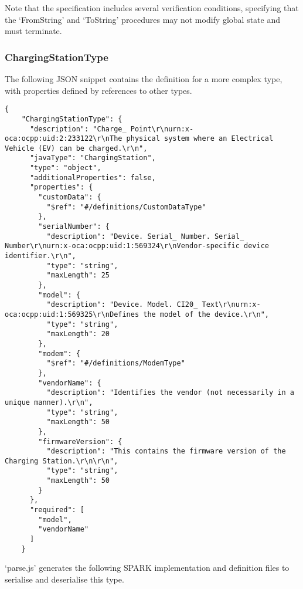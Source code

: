 \documentclass[12pt,openany,a4paper]{book}
\begin{document}
Note that the specification includes several verification conditions, specifying that the `FromString' and `ToString' procedures may not modify global state and must terminate.

\subsubsection{ChargingStationType}
The following JSON snippet contains the definition for a more complex type, with properties defined by references to other types.
\begin{verbatim}
{
    "ChargingStationType": {
      "description": "Charge_ Point\r\nurn:x-oca:ocpp:uid:2:233122\r\nThe physical system where an Electrical Vehicle (EV) can be charged.\r\n",
      "javaType": "ChargingStation",
      "type": "object",
      "additionalProperties": false,
      "properties": {
        "customData": {
          "$ref": "#/definitions/CustomDataType"
        },
        "serialNumber": {
          "description": "Device. Serial_ Number. Serial_ Number\r\nurn:x-oca:ocpp:uid:1:569324\r\nVendor-specific device identifier.\r\n",
          "type": "string",
          "maxLength": 25
        },
        "model": {
          "description": "Device. Model. CI20_ Text\r\nurn:x-oca:ocpp:uid:1:569325\r\nDefines the model of the device.\r\n",
          "type": "string",
          "maxLength": 20
        },
        "modem": {
          "$ref": "#/definitions/ModemType"
        },
        "vendorName": {
          "description": "Identifies the vendor (not necessarily in a unique manner).\r\n",
          "type": "string",
          "maxLength": 50
        },
        "firmwareVersion": {
          "description": "This contains the firmware version of the Charging Station.\r\n\r\n",
          "type": "string",
          "maxLength": 50
        }
      },
      "required": [
        "model",
        "vendorName"
      ]
    }
\end{verbatim}

`parse.js' generates the following SPARK implementation and definition files to serialise and deserialise this type.
\end{document}
